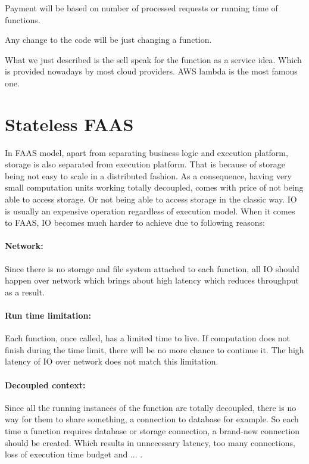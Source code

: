 \documentclass[a4]{report}
\begin{document}
    Payment will be based on number of processed requests or running time of functions.

    Any change to the code will be just changing a function.

    What we just described is the sell speak for the function as a service idea.
    Which is provided nowadays by most cloud providers.
    AWS lambda\cite{lambda} is the most famous one.


    \section{Stateless FAAS}
    In FAAS model, apart from separating business logic and execution platform, storage is also separated from
    execution platform.
    That is because of storage being not easy to scale in a distributed fashion.
    As a consequence, having very small computation units working totally decoupled, comes with price of not being
    able to access storage.
    Or not being able to access storage in the classic way.
    IO is usually an expensive operation regardless of execution model.
    When it comes to FAAS, IO becomes much harder to achieve due to following reasons:

    \paragraph{Network:} Since there is no storage and file system attached to each function, all IO should happen
    over network which brings about high latency which reduces throughput as a result.

    \paragraph{Run time limitation:} Each function, once called, has a limited time to live.
    If computation does not finish during the time limit, there will be no more chance to continue it.
    The high latency of IO over network does not match this limitation.

    \paragraph{Decoupled context:} Since all the running instances of the function are totally decoupled, there is
    no way for them to share something, a connection to database for example.
    So each time a function requires database or storage connection, a brand-new connection should be created.
    Which results in unnecessary latency, too many connections, loss of execution time budget and ... .
\end{document}
